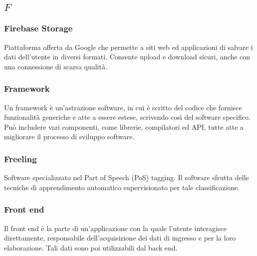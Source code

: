 \subsection*{\quad$F\quad$}
\subsubsection*{Firebase Storage}
Piattaforma offerta da Google che permette a siti web ed applicazioni di salvare i dati dell'utente in diversi formati. Consente upload e download sicuri, anche con una connessione di scarsa qualità.

\subsubsection*{Framework}
Un framework è un'astrazione software, in cui è scritto del codice che fornisce funzionalità generiche e atte a essere estese, scrivendo così del software specifico. Può includere vari componenti, come librerie, compilatori ed API\glo, tutte atte a migliorare il processo di sviluppo software.

\subsubsection*{Freeling}
Software specializzato nel Part of Speech (PoS) tagging\glo. Il software sfrutta delle tecniche di apprendimento automatico supervisionato per tale classificazione.  

\subsubsection*{Front end}
Il front end è la parte di un'applicazione con la quale l'utente interagisce direttamente, responsabile dell'acquisizione dei dati di ingresso e per la loro elaborazione. Tali dati sono poi utilizzabili dal back end\glo. 

